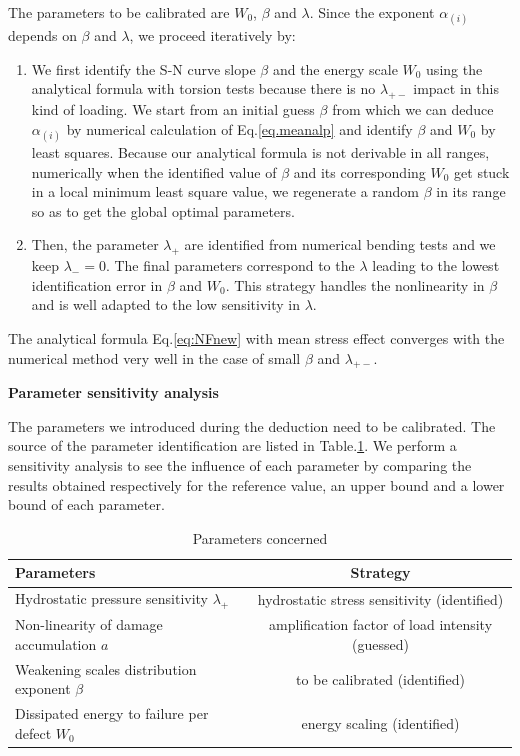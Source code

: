 The parameters to be calibrated are $W_0$, $\beta$ and $\lambda$. Since the exponent $\alpha_{(i)}$ depends on $\beta$ and $\lambda$, we proceed iteratively by:

\begin{enumerate}
	\item We first identify the S-N curve slope $\beta$ and the energy scale $W_0$ using the analytical formula with torsion tests because there is no $\lambda_{+-}$ impact in this kind of loading. We start from an initial guess $\beta$ from which we can deduce $\alpha_{(i)}$ by  numerical calculation of Eq.\eqref{eq.meanalp} and identify $\beta$ and $W_0$ by least squares.  Because our analytical formula is not derivable in all ranges, numerically when the identified value of $\beta$ and its corresponding $W_0$ get stuck in a local minimum least square value, we regenerate a random $\beta$ in its range so as to get the global optimal parameters.
	
	\item Then, the parameter $\lambda_{+}$ are identified from numerical bending tests and we keep $\lambda_-=0$. The final parameters correspond to the $\lambda$ leading to the lowest identification error in $\beta$ and $W_0$. This strategy handles the nonlinearity in $\beta$ and is well adapted to the low sensitivity in $\lambda$.
\end{enumerate}



The analytical formula Eq.\eqref{eq:NFnew} with mean stress effect converges with the numerical method very well in the case of small $\beta$ and $\lambda_{+-}$. 

\vspace{6pt}
\textbf{Parameter sensitivity analysis}
\vspace{6pt}

The parameters we introduced during the deduction need to be calibrated. The source of the parameter identification are listed in Table.\ref{paras}.
We perform a sensitivity analysis to see the influence of each parameter by comparing the results obtained respectively for the reference value, an upper bound and a lower bound of each parameter.

\begin{table}[!h]
	\centering
	\begin{tabular}{l|c}
		\hline
		\textbf{Parameters}                                  & \multicolumn{1}{c}{\textbf{Strategy}} \\ \hline
		Hydrostatic pressure sensitivity $\lambda_+$           & hydrostatic stress sensitivity (identified)         \\
		Non-linearity of damage accumulation  $a$        & amplification factor of load intensity (guessed)     \\
		Weakening scales distribution exponent  $\beta$      & to be calibrated (identified)                   \\
		Dissipated energy to failure per defect  $W_0$ & energy scaling (identified)              \\ \hline
	\end{tabular}
	\caption{Parameters concerned}
	\label{paras}
\end{table}

